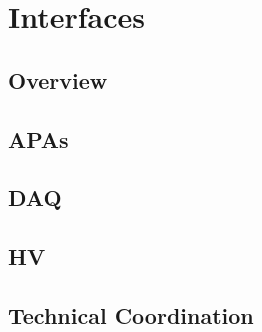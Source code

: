 \section{Interfaces}
\label{sec:fdsp-tpcelec-interfaces}

\subsection{Overview}
\label{sec:fdsp-tpcelec-interfaces-overview}

\subsection{APAs}
\label{sec:fdsp-tpcelec-interfaces-apa}

\subsection{DAQ}
\label{sec:fdsp-tpcelec-interfaces-daq}

\subsection{HV}
\label{sec:fdsp-tpcelec-interfaces-hv}

\subsection{Technical Coordination}
\label{sec:fdsp-tpcelec-interfaces-tc}
